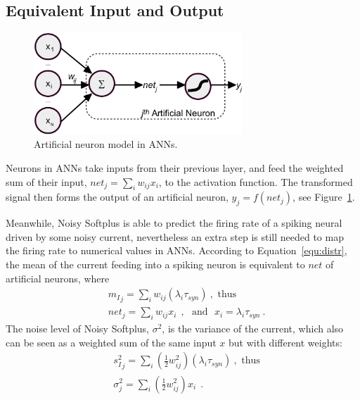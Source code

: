 	\subsection{Equivalent Input and Output}
	
	\begin{figure}[bt]
		\centering
		\includegraphics[width=0.7\textwidth]{pics_sdlm/neuron.pdf}
		\caption{Artificial neuron model in ANNs. }
		\label{Fig:neuron}
	\end{figure}
	Neurons in ANNs take inputs from their previous layer, and feed the weighted sum of their input, $net_j = \sum_i w_{ij}x_i$, to the activation function.
	The transformed signal then forms the output of an artificial neuron, $y_j=f(net_j)$, see Figure~\ref{Fig:neuron}.
	
	Meanwhile, Noisy Softplus is able to predict the firing rate of a spiking neural driven by some noisy current, nevertheless an extra step is still needed to map the firing rate to numerical values in ANNs.
	According to Equation~\ref{equ:distr}, the mean of the current feeding into a spiking neuron is equivalent to $net$ of artificial neurons, where
	\begin{equation}
	\begin{aligned}
		& {m_I}_j = \sum_i w_{ij}(\lambda_{i}\tau_{syn})~, \textrm{  thus}\\
		& net_j= \sum_i w_{ij} x_i~~, \textrm{~~and~~}
		x_i = \lambda_{i}\tau_{syn}~.
	\end{aligned}
	\label{equ:mi_input}
	\end{equation}
	The noise level of Noisy Softplus, $\sigma^2$, is the variance of the current, which also can be seen as a weighted sum of the same input $x$ but with different weights:
	\begin{equation}
	\begin{aligned}
		& {s_I^2}_j=\sum_i(\frac{1}{2} w_{ij}^2) (\lambda_{i}\tau_{syn})~, \textrm{  thus}\\
		& \sigma^2_j= \sum_i (\frac{1}{2} w_{ij}^2) x_i~~.
	\end{aligned}
	\label{equ:si_input}
	\end{equation}
	
